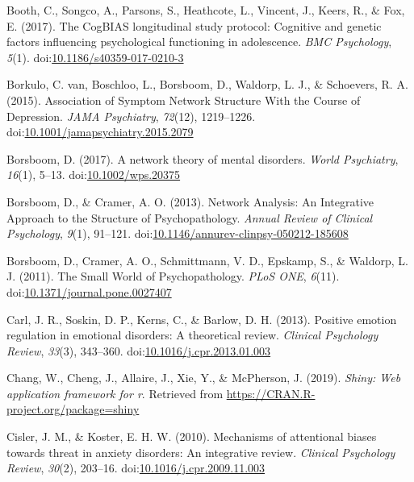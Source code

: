 \documentclass[man,floatsintext]{apa6}
\begin{document}
\leavevmode\hypertarget{ref-booth_cogbias_2017}{}%
Booth, C., Songco, A., Parsons, S., Heathcote, L., Vincent, J., Keers, R., \& Fox, E. (2017). The CogBIAS longitudinal study protocol: Cognitive and genetic factors influencing psychological functioning in adolescence. \emph{BMC Psychology}, \emph{5}(1). doi:\href{https://doi.org/10.1186/s40359-017-0210-3}{10.1186/s40359-017-0210-3}

\leavevmode\hypertarget{ref-van_borkulo_association_2015}{}%
Borkulo, C. van, Boschloo, L., Borsboom, D., Waldorp, L. J., \& Schoevers, R. A. (2015). Association of Symptom Network Structure With the Course of Depression. \emph{JAMA Psychiatry}, \emph{72}(12), 1219--1226. doi:\href{https://doi.org/10.1001/jamapsychiatry.2015.2079}{10.1001/jamapsychiatry.2015.2079}

\leavevmode\hypertarget{ref-Borsboom2017}{}%
Borsboom, D. (2017). A network theory of mental disorders. \emph{World Psychiatry}, \emph{16}(1), 5--13. doi:\href{https://doi.org/10.1002/wps.20375}{10.1002/wps.20375}

\leavevmode\hypertarget{ref-borsboom_network_2013}{}%
Borsboom, D., \& Cramer, A. O. (2013). Network Analysis: An Integrative Approach to the Structure of Psychopathology. \emph{Annual Review of Clinical Psychology}, \emph{9}(1), 91--121. doi:\href{https://doi.org/10.1146/annurev-clinpsy-050212-185608}{10.1146/annurev-clinpsy-050212-185608}

\leavevmode\hypertarget{ref-borsboom_small_2011}{}%
Borsboom, D., Cramer, A. O., Schmittmann, V. D., Epskamp, S., \& Waldorp, L. J. (2011). The Small World of Psychopathology. \emph{PLoS ONE}, \emph{6}(11). doi:\href{https://doi.org/10.1371/journal.pone.0027407}{10.1371/journal.pone.0027407}

\leavevmode\hypertarget{ref-Carl2013}{}%
Carl, J. R., Soskin, D. P., Kerns, C., \& Barlow, D. H. (2013). Positive emotion regulation in emotional disorders: A theoretical review. \emph{Clinical Psychology Review}, \emph{33}(3), 343--360. doi:\href{https://doi.org/10.1016/j.cpr.2013.01.003}{10.1016/j.cpr.2013.01.003}

\leavevmode\hypertarget{ref-R-shiny}{}%
Chang, W., Cheng, J., Allaire, J., Xie, Y., \& McPherson, J. (2019). \emph{Shiny: Web application framework for r}. Retrieved from \url{https://CRAN.R-project.org/package=shiny}

\leavevmode\hypertarget{ref-Cisler2010a}{}%
Cisler, J. M., \& Koster, E. H. W. (2010). Mechanisms of attentional biases towards threat in anxiety disorders: An integrative review. \emph{Clinical Psychology Review}, \emph{30}(2), 203--16. doi:\href{https://doi.org/10.1016/j.cpr.2009.11.003}{10.1016/j.cpr.2009.11.003}
\end{document}
